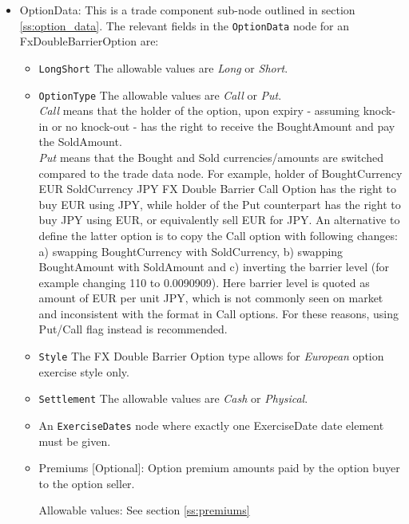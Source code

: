 \begin{itemize}


\item OptionData: This is a trade component sub-node outlined in section \ref{ss:option_data}. 
The relevant fields in the \lstinline!OptionData! node for an FxDoubleBarrierOption are:

\begin{itemize}
\item \lstinline!LongShort! The allowable values are \emph{Long} or \emph{Short}.

\item \lstinline!OptionType! The allowable values are \emph{Call} or \emph{Put}. \\
 \emph{Call} means that the holder of the option, upon expiry - assuming knock-in or no knock-out - has the right to receive the BoughtAmount and pay the SoldAmount. \\\emph{Put} means that the Bought and Sold currencies/amounts are switched compared to the trade data node. 
For example, holder of BoughtCurrency EUR SoldCurrency JPY FX Double Barrier Call Option has the right to buy EUR using JPY, while
holder of the Put counterpart has the right to buy JPY using EUR, or equivalently sell EUR for JPY. An alternative to define the latter option is to copy the Call option with following changes:\\
a) swapping BoughtCurrency with SoldCurrency, b) swapping BoughtAmount with SoldAmount and c) inverting the barrier level (for example changing 110 to 0.0090909). Here barrier level is
quoted as amount of EUR per unit JPY, which is not commonly seen on market and inconsistent with the format in Call options. For these reasons, using Put/Call flag instead is recommended.

\item  \lstinline!Style! The FX Double Barrier Option type allows for \emph{European} option exercise style only.

\item  \lstinline!Settlement! The allowable values are \emph{Cash} or \emph{Physical}.

\item An \lstinline!ExerciseDates! node where exactly one ExerciseDate date element must be given.

\item Premiums [Optional]: Option premium amounts paid by the option buyer to the option seller.

Allowable values:  See section \ref{ss:premiums}


\end{itemize}
\end{itemize}
